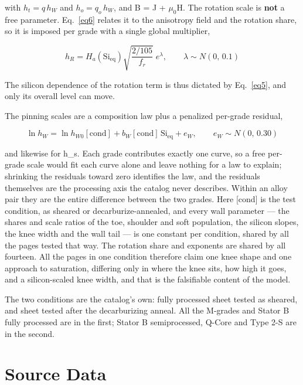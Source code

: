\documentclass[
  11pt,
]{article}
\begin{document}
with \(h_t = q\,h_W\) and \(h_o = q_o\,h_W\), and B = J + \(\mu_{0}\)H. The rotation scale is \textbf{not} a free parameter. Eq.~\eqref{eq6} relates it to the anisotropy field and the rotation share, so it is imposed per grade with a single global multiplier,

\begin{equation}\label{eq9}
h_R = H_a(\mathrm{Si_{eq}})\sqrt{\frac{2/105}{f_r}}\;e^{\lambda}, \qquad \lambda \sim N(0,\,0.1)
\end{equation}

The silicon dependence of the rotation term is thus dictated by Eq.~\eqref{eq5}, and only its overall level can move.

The pinning scales are a composition law plus a penalized per-grade residual,

\begin{equation}\label{eq10}
\ln h_W = \ln h_{W0}[\text{cond}] + b_W[\text{cond}]\,\mathrm{Si_{eq}} + e_W, \qquad e_W \sim N(0,\,0.30)
\end{equation}

and likewise for h\_s. Each grade contributes exactly one curve, so a free per-grade scale would fit each curve alone and leave nothing for a law to explain; shrinking the residuals toward zero identifies the law, and the residuals themselves are the processing axis the catalog never describes. Within an alloy pair they are the entire difference between the two grades. Here [cond] is the test condition, as sheared or decarburize-annealed, and every wall parameter --- the shares and scale ratios of the toe, shoulder and soft population, the silicon slopes, the knee width and the wall tail --- is one constant per condition, shared by all the pages tested that way. The rotation share and exponents are shared by all fourteen. All the pages in one condition therefore claim one knee shape and one approach to saturation, differing only in where the knee sits, how high it goes, and a silicon-scaled knee width, and that is the falsifiable content of the model.

The two conditions are the catalog's own: fully processed sheet tested as sheared, and sheet tested after the decarburizing anneal. All the M-grades and Stator B fully processed are in the first; Stator B semiprocessed, Q-Core and Type 2-S are in the second.

\section{Source Data}\label{source-data}
\end{document}
